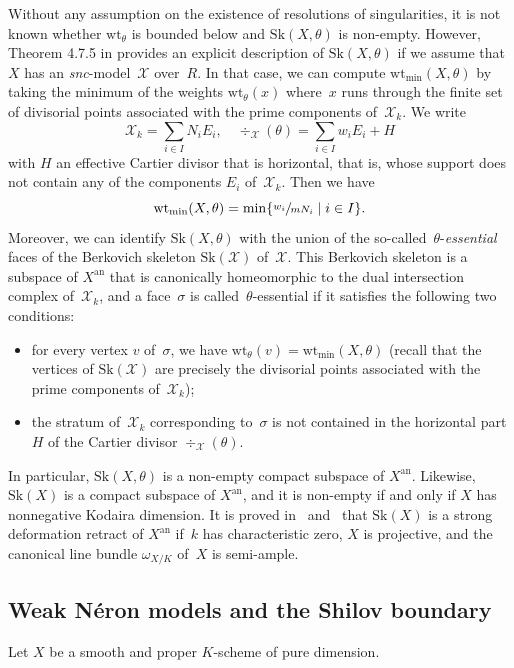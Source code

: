 \documentclass[JEP,XML,SOM,Unicode,NoFloatCountersInSection]{cedram}
\theoremstyle{definition}
\numberwithin{equation}{subsection}
\newcommand{\cX}{\ensuremath{\mathscr{X}}}
\newcommand{\snc}{\textit{snc}}
\newcommand{\an}{\mathrm{an}}
\newcommand{\Sk}{\mathrm{Sk}}
\newcommand{\wt}{\mathrm{wt}}
\let\form\theta
\begin{document}
Without any assumption on the existence of resolutions of singularities, it is not known whether $\wt_{\form}$ is bounded below and $\Sk(X,\form)$ is non-empty.
However, Theorem 4.7.5 in \cite{MuNi} provides an explicit description of $\Sk(X,\form)$ if we assume that $X$ has an \snc-model~$\cX$ over~$R$.
In that case, we can compute $\wt_{\min}(X,\form)$ by taking the minimum of the weights $\wt_{\form}(x)$ where~$x$ runs through the finite set of divisorial points associated with the prime components of~$\cX_k$. We write
\[
\cX_k=\sum_{i\in I}N_i E_i, \quad \div_{\cX}(\form)=\sum_{i\in I}w_i E_i + H
\]
with $H$ an effective Cartier divisor that is horizontal, that is, whose support does not contain any of the components $E_i$ of~$\cX_k$. Then we have
\[
\wt_{\min}(X,\form)=\min \{\sfrac{w_i}{mN_i}\mid i\in I\}.
\]
Moreover, we can identify $\Sk(X,\form)$ with the union of the so-called~$\form$-{\em essential} faces of the Berkovich skeleton $\Sk(\cX)$ of~$\cX$.
This Berkovich skeleton is a subspace of $X^{\an}$ that is canonically homeomorphic to the dual intersection complex of~$\cX_k$, and a face~$\sigma$ is called~$\form$-essential if it satisfies the following two conditions:
\begin{itemize}
\item for every vertex $v$ of~$\sigma$, we have $\wt_{\form}(v)=\wt_{\min}(X,\form)$ (recall that the vertices of $\Sk(\cX)$ are precisely the divisorial points associated with the prime components of~$\cX_k$);

\item the stratum of~$\cX_k$ corresponding to~$\sigma$ is not contained in the horizontal part $H$ of the Cartier divisor $\div_{\cX}(\form)$.
\end{itemize}
In particular, $\Sk(X,\form)$ is a non-empty compact subspace of $X^{\an}$. Likewise, $\Sk(X)$ is a compact subspace of $X^{\an}$, and it is non-empty if and only if $X$ has nonnegative Kodaira dimension.
It is proved in~\cite[3.3.5]{NiXu} and~\cite[Th.\,24]{KNX} that $\Sk(X)$ is a strong deformation retract of $X^{\an}$ if~$k$ has characteristic zero, $X$ is projective, and the canonical line bundle $\omega_{X/K}$ of~$X$ is semi-ample.

\subsection{Weak Néron models and the Shilov boundary}\label{sec:shilov}
Let $X$ be a smooth and proper $K$\nobreakdash-scheme of pure dimension.
\end{document}
